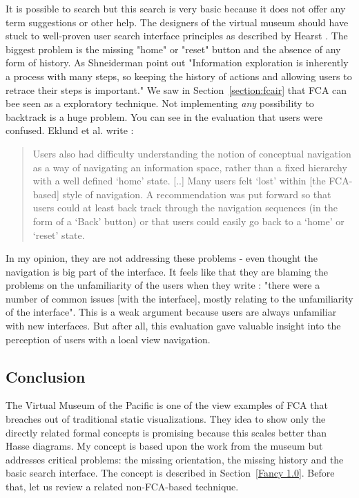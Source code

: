 \documentclass[11pt]{report}
\begin{document}
It is possible to search but this search is very basic because it does not offer any term suggestions or other help. The designers of the virtual museum should have stuck to well-proven user search interface principles as described by Hearst \cite{Hearst2009}. The biggest problem is the missing "home" or "reset" button and the absence of any form of history. As Shneiderman \cite{Shneiderman1996} point out "Information exploration is inherently a process with many steps, so keeping the history of actions and allowing users to retrace their steps is important." We saw in Section~\ref{section:fcair} that FCA can bee seen as a exploratory technique. Not implementing \textit{any} possibility to backtrack is a huge problem. You can see in the evaluation that users were confused. Eklund et al. write \cite{Eklund2012}:
 \begin{quote}
 Users also had difficulty understanding the notion of conceptual navigation as a way of navigating an information space, rather than a fixed hierarchy with a well defined `home' state. [..] Many users felt `lost' within [the FCA-based] style of navigation. A recommendation was put forward so that users could at least back track through the navigation sequences (in the form of a `Back' button) or that users could easily go back to a `home' or `reset' state.
 \end{quote}
  In my opinion, they are not addressing these problems - even thought the navigation is big part of the interface. It feels like that they are blaming the problems on the unfamiliarity of the users when they write \cite{Eklund2012}: "there were a number of common issues [with the interface], mostly relating to the unfamiliarity of the interface". This is a weak argument because users are always unfamiliar with new interfaces. But after all, this evaluation gave valuable insight into the perception of users with a local view navigation.
  
\subsection{Conclusion}

The Virtual Museum of the Pacific is one of the view examples of FCA that breaches out of traditional static visualizations. They idea to show only the directly related formal concepts is promising because this scales better than Hasse diagrams. My concept is based upon the work from the museum but addresses critical problems: the missing orientation, the missing history and the basic search interface. The concept is described in Section~\ref{Fancy 1.0}. Before that, let us review a related non-FCA-based technique.\\
\end{document}
